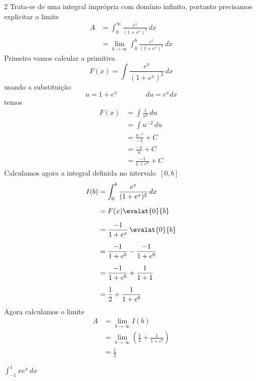 \documentclass[a4paper,12pt,fleqn]{article}
\begin{document}
\begin{answer}
\begin{multicols}{2}
Trata-se de uma integral imprópria com domínio infinito,
portanto precisamos explicitar o limite
\begin{align*}
  A
  & = \int_0^{\infty} \frac{e^x}{(1 + e^x)^2}\, dx \\[2mm]
  & = \lim_{b \to \infty} \int_0^b \frac{e^x}{(1 + e^x)^2}\, dx
\end{align*}
Primeiro vamos calcular a primitiva
\[
  F(x) = \int \frac{e^x}{(1 + e^x)^2}\, dx
\]
usando a substituição
\[
  u = 1 + e^x
  \qquad\qquad
  du = e^x dx
\]
temos
\begin{align*}
  F(x)
  & = \int \frac{1}{u^2}\, du   \\[2mm]
  & = \int u^{-2}\, du          \\[2mm]
  & = \frac{u^{-1}}{-1} + C     \\[2mm]
  & = \frac{-1}{u} + C     \\[2mm]
  & = \frac{-1}{1 + e^x} + C
\end{align*}
Calculamos agora a integral definida no intervalo~$[0, b]$
\begin{align*}
  I(b)
  & = \int_0^b \frac{e^x}{(1 + e^x)^2}\, dx       \\[2mm]
  & = F(x) \evalat{0}{b}                          \\[2mm]
  & = \frac{-1}{1 + e^x}\, \evalat{0}{b}          \\[2mm]
  & = \frac{-1}{1 + e^b} - \frac{-1}{1 + e^0}     \\[2mm]
  & = \frac{-1}{1 + e^b} + \frac{1}{1 + 1}        \\[2mm]
  & = \frac{1}{2} + \frac{1}{1 + e^b}
\end{align*}
Agora  calculamos o limite
\begin{align*}
  A
  & = \lim_{b \to \infty} I(b) \\[2mm]
  & = \lim_{b \to \infty} \left(\frac{1}{2} + \frac{1}{1 + e^b}\right) \\[2mm]
  & = \frac{1}{2}
\end{align*}
\end{multicols}
\end{answer}

\(
  \int_{-1}^1 x e^x \, dx
\)
\end{document}
